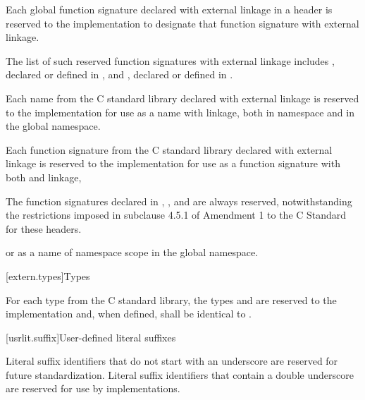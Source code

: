 \pnum
Each
%
global function signature declared with
%
external linkage in a header is reserved to the
implementation to designate that function signature with
%
external linkage.%
\begin{footnote}
The list of such reserved function
signatures with external linkage includes
%
,
declared or defined in ,
and
%
%
,
declared or defined in
.
\end{footnote}

\pnum
Each name from the C standard library declared with external linkage
%
is reserved to the implementation for use as a name with
%
%
linkage,
both in namespace  and in the global namespace.

\pnum
Each function signature from the C standard library declared with
%
external linkage
is reserved to the implementation for use as
a function signature with both
%
and
%
linkage,
\begin{footnote}
The function signatures declared in
%
,
,
and
are always reserved, notwithstanding the restrictions imposed in subclause
4.5.1 of Amendment 1 to the C Standard for these headers.
\end{footnote}
or as a name of namespace scope in the global namespace.

[extern.types]{Types}

\pnum
For each type  from the C standard library,
the types
and
are reserved to the implementation and, when defined,
shall be identical to
.

[usrlit.suffix]{User-defined literal suffixes}

\pnum
Literal suffix identifiers that do not start with an underscore are reserved for future standardization.
Literal suffix identifiers that contain a double underscore
\tcode{\unun}
%
are reserved for use by \Cpp{} implementations.

